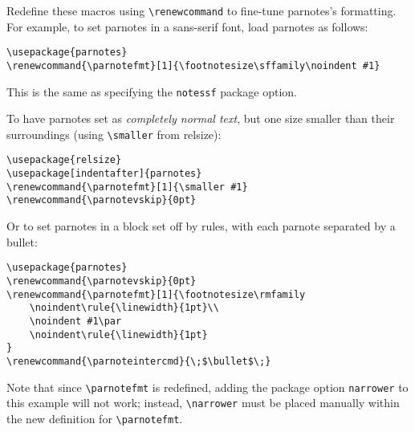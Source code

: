 \documentclass[10pt]{article}
\renewcommand{\parnotefmt}[1]{\centerline{\colorbox{black!10}{\parbox{0.82\textwidth}{\footnotesize\sffamily\noindent #1}}}}
\begin{document}
Redefine these macros using \verb+\renewcommand+ to fine-tune \textsf{parnotes}'s formatting. For
example, to set parnotes in a sans-serif font, load \textsf{parnotes} as follows:
\begin{lstlisting}
\usepackage{parnotes}
\renewcommand{\parnotefmt}[1]{\footnotesize\sffamily\noindent #1}
\end{lstlisting}
This is the same as specifying the \texttt{notessf} package option.

To have parnotes set as \textit{completely normal text}, but one size smaller than their surroundings (using \verb+\smaller+ from \textsf{relsize}):
\begin{lstlisting}
\usepackage{relsize}
\usepackage[indentafter]{parnotes}
\renewcommand{\parnotefmt}[1]{\smaller #1}
\renewcommand{\parnotevskip}{0pt}
\end{lstlisting}
Or to set parnotes in a block set off by rules, with each parnote separated by a bullet:
\begin{lstlisting}
\usepackage{parnotes}
\renewcommand{\parnotevskip}{0pt}
\renewcommand{\parnotefmt}[1]{\footnotesize\rmfamily
    \noindent\rule{\linewidth}{1pt}\\
    \noindent #1\par
    \noindent\rule{\linewidth}{1pt}
}
\renewcommand{\parnoteintercmd}{\;$\bullet$\;}
\end{lstlisting}

Note that since \verb+\parnotefmt+ is redefined, adding the package option \texttt{narrower} to this example will not work;
instead, \verb+\narrower+ must be placed manually within the new definition for \verb+\parnotefmt+.
\end{document}
